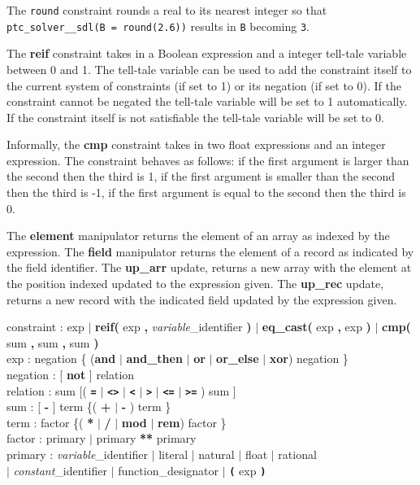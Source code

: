 \documentclass{article}
\begin{document}
The \texttt{round} constraint rounds a real to its nearest integer so that
\texttt{ptc\_solver\_\_sdl(B = round(2.6))} results in \texttt{B} becoming
\texttt{3}.

The \textbf{reif}
constraint takes in a Boolean expression and a integer tell-tale variable between
0 and 1.
The tell-tale variable can be used to add the constraint itself to the current
system of
constraints (if set to 1) or its negation (if set to 0). If the constraint cannot
be negated
the tell-tale variable will be set to 1 automatically. If the constraint itself
is not satisfiable
 the tell-tale variable will be set to 0.

Informally, the \textbf{cmp} constraint takes in two float expressions and an
integer
expression. The constraint behaves as follows: if the first argument is larger
than the
second then the third is 1, if the first argument is smaller than the second then
the
third is -1, if the first argument is equal to the second then the third is 0.

 The
\textbf{element} manipulator returns the element of an array as indexed by the
expression.
The \textbf{field} manipulator returns the element of a record as indicated by
the field
identifier. The \textbf{up\_arr} update, returns a new array with the element at
the
position indexed updated to the expression given. The \textbf{up\_rec} update,
returns a
new record with the indicated field updated by the expression given.


\begin{tabbing}
constraint : exp
$\mid$ \textbf{reif(} exp \textbf{, } \textit{variable}\_identifier \textbf{)}
$\mid$ \textbf{eq\_cast(} exp \textbf{, } exp \textbf{)}
$\mid$ \textbf{cmp(} sum \textbf{, } sum \textbf{, } sum \textbf{)} \\
exp : negation \{ (\textbf{and} $\mid$ \textbf{and\_then} $\mid$ \textbf{or}
$\mid$ \textbf{or\_else} $\mid$ \textbf{xor}) negation \} \\
negation : [ \textbf{not} ] relation \\
relation : sum [( \textbf{\texttt{=}} $\mid$ \textbf{\texttt{<>}} $\mid$
\textbf{\texttt{<}} $\mid$ \textbf{\texttt{>}} $\mid$ \textbf{\texttt{<=}} $\mid$
\textbf{\texttt{>=}} ) sum ] \\
sum : [ \textbf{-} ] term \{( \textbf{+} $\mid$ \textbf{-} ) term \} \\
term : factor \{( \textbf{*} $\mid$ \textbf{/} $\mid$ \textbf{mod} $\mid$
\textbf{rem}) factor \} \\
factor : primary $\mid$ primary \textbf{**} primary \\
primary : \= \textit{variable}\_identifier $\mid$ literal $\mid$ natural $\mid$
float $\mid$ rational \\
    \> $\mid$ \textit{constant}\_identifier $\mid$ function\_designator
$\mid$ \textbf{\texttt{(}} exp \textbf{\texttt{)}}
\end{tabbing}
\end{document}
